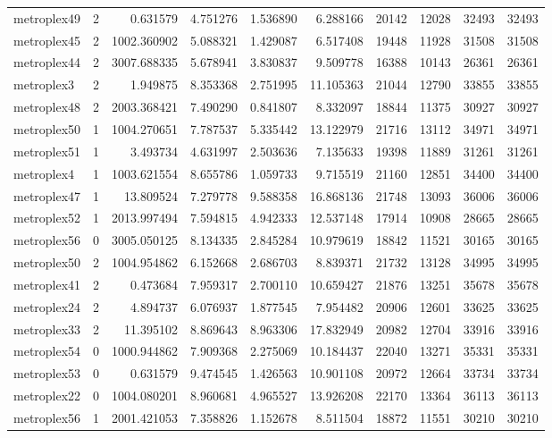 \begin{longtable}{|l|r|r|r|r|r|r|r|r|r|}
metroplex49 & 2 & 0.631579 & 4.751276 & 1.536890 & 6.288166 & 20142 & 12028 & 32493 & 32493 \\
metroplex45 & 2 & 1002.360902 & 5.088321 & 1.429087 & 6.517408 & 19448 & 11928 & 31508 & 31508 \\
metroplex44 & 2 & 3007.688335 & 5.678941 & 3.830837 & 9.509778 & 16388 & 10143 & 26361 & 26361 \\
metroplex3 & 2 & 1.949875 & 8.353368 & 2.751995 & 11.105363 & 21044 & 12790 & 33855 & 33855 \\
metroplex48 & 2 & 2003.368421 & 7.490290 & 0.841807 & 8.332097 & 18844 & 11375 & 30927 & 30927 \\
metroplex50 & 1 & 1004.270651 & 7.787537 & 5.335442 & 13.122979 & 21716 & 13112 & 34971 & 34971 \\
metroplex51 & 1 & 3.493734 & 4.631997 & 2.503636 & 7.135633 & 19398 & 11889 & 31261 & 31261 \\
metroplex4 & 1 & 1003.621554 & 8.655786 & 1.059733 & 9.715519 & 21160 & 12851 & 34400 & 34400 \\
metroplex47 & 1 & 13.809524 & 7.279778 & 9.588358 & 16.868136 & 21748 & 13093 & 36006 & 36006 \\
metroplex52 & 1 & 2013.997494 & 7.594815 & 4.942333 & 12.537148 & 17914 & 10908 & 28665 & 28665 \\
metroplex56 & 0 & 3005.050125 & 8.134335 & 2.845284 & 10.979619 & 18842 & 11521 & 30165 & 30165 \\
metroplex50 & 2 & 1004.954862 & 6.152668 & 2.686703 & 8.839371 & 21732 & 13128 & 34995 & 34995 \\
metroplex41 & 2 & 0.473684 & 7.959317 & 2.700110 & 10.659427 & 21876 & 13251 & 35678 & 35678 \\
metroplex24 & 2 & 4.894737 & 6.076937 & 1.877545 & 7.954482 & 20906 & 12601 & 33625 & 33625 \\
metroplex33 & 2 & 11.395102 & 8.869643 & 8.963306 & 17.832949 & 20982 & 12704 & 33916 & 33916 \\
metroplex54 & 0 & 1000.944862 & 7.909368 & 2.275069 & 10.184437 & 22040 & 13271 & 35331 & 35331 \\
metroplex53 & 0 & 0.631579 & 9.474545 & 1.426563 & 10.901108 & 20972 & 12664 & 33734 & 33734 \\
metroplex22 & 0 & 1004.080201 & 8.960681 & 4.965527 & 13.926208 & 22170 & 13364 & 36113 & 36113 \\
metroplex56 & 1 & 2001.421053 & 7.358826 & 1.152678 & 8.511504 & 18872 & 11551 & 30210 & 30210 \\

\end{longtable}
